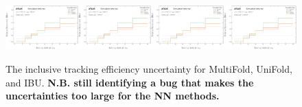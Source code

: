 \begin{figure}[h!]
\includegraphics[width=0.25\textwidth,page=81]{figures/SimResults/TrackJet_SystEffect.pdf}\includegraphics[width=0.25\textwidth,page=85]{figures/SimResults/TrackJet_SystEffect.pdf}\includegraphics[width=0.25\textwidth,page=89]{figures/SimResults/TrackJet_SystEffect.pdf}\includegraphics[width=0.25\textwidth,page=93]{figures/SimResults/TrackJet_SystEffect.pdf}
\caption{The inclusive tracking efficiency uncertainty for MultiFold, UniFold, and IBU.  \textbf{N.B. still identifying a bug that makes the uncertainties too large for the NN methods.}}
\label{fig:simresultsmulti_trackjetuncertsl1a}
\end{figure}

